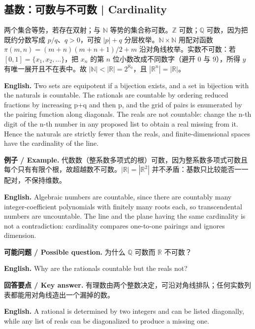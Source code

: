 \documentclass[UTF8,11pt,a4paper]{ctexart}
\newcommand{\EN}[1]{\par\noindent\textbf{English.} #1\par}
\let\APSsubsection\subsection
\renewcommand{\subsection}[1]{\Needspace{6\baselineskip}\APSsubsection{#1}}
\newcommand{\EX}[2]{\par\noindent\textbf{例子 / Example.} #1\par\EN{#2}}
\newcommand{\ASK}[4]{\par\noindent\textbf{可能问题 / Possible question.} #1\par\EN{#2}\noindent\textbf{回答要点 / Key answer.} #3\par\EN{#4}\medskip}
\begin{document}
\subsection{基数：可数与不可数 | Cardinality}
\noindent 两个集合等势，若存在双射；与 $\mathbb N$ 等势的集合称可数。$\mathbb Z$ 可数；$\mathbb Q$ 可数，因为把既约分数写成 $p/q$、$q>0$，可按 $|p|+q$ 分层枚举。$\mathbb N\times\mathbb N$ 用配对函数 $\pi(m,n)=(m+n)(m+n+1)/2+m$ 沿对角线枚举。实数不可数：若 $[0,1]=\{x_1,x_2,\ldots\}$，把 $x_n$ 的第 $n$ 位小数改成不同数字（避开 $0$ 与 $9$），所得 $y$ 有唯一展开且不在表中。故 $|\mathbb N|<|\mathbb R|=2^{\aleph_0}$，且 $|\mathbb R^n|=|\mathbb R|$。
\EN{Two sets are equipotent if a bijection exists, and a set in bijection with the naturals is countable. The rationals are countable by ordering reduced fractions by increasing p+q and then p, and the grid of pairs is enumerated by the pairing function along diagonals. The reals are not countable: change the n-th digit of the n-th number in any proposed list to obtain a real missing from it. Hence the naturals are strictly fewer than the reals, and finite-dimensional spaces have the cardinality of the line.}
\EX{代数数（整系数多项式的根）可数，因为整系数多项式可数且每个只有有限个根，故超越数不可数。$|\mathbb R|=|\mathbb R^2|$ 并不矛盾：基数只比较能否一一配对，不保持维数。}{Algebraic numbers are countable, since there are countably many integer-coefficient polynomials with finitely many roots each, so transcendental numbers are uncountable. The line and the plane having the same cardinality is not a contradiction: cardinality compares one-to-one pairings and ignores dimension.}
\ASK{为什么 $\mathbb Q$ 可数而 $\mathbb R$ 不可数？}{Why are the rationals countable but the reals not?}{有理数由两个整数决定，可沿对角线排队；任何实数列表都能用对角线造出一个漏掉的数。}{A rational is determined by two integers and can be listed diagonally, while any list of reals can be diagonalized to produce a missing one.}
\end{document}
